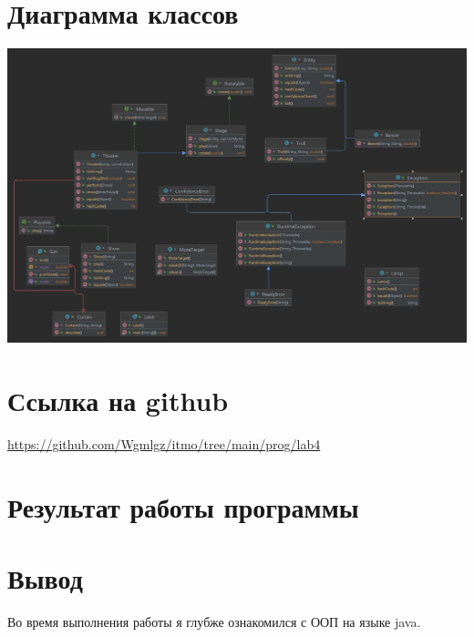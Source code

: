 \documentclass{article}
\begin{document}
\section{Диаграмма классов}

\begin{center}
  \includegraphics[scale=0.5]{diagram.jpg}
\end{center}

\section{Ссылка на github}
\url{https://github.com/Wgmlgz/itmo/tree/main/prog/lab4}
\section{Результат работы программы}
\section{Вывод}
Во время выполнения работы я глубже ознакомился с ООП на языке java.
\end{document}

